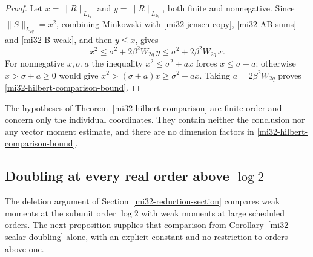 \documentclass[11pt]{article}
\theoremstyle{definition}
\theoremstyle{remark}
\newcommand{\norm}[1]{\lVert#1\rVert}
\begin{document}
\begin{proof}
Let $x=\norm{R}_{L_{4q}}$ and $y=\norm{R}_{L_{2q}}$, both finite and
nonnegative. Since $\norm{S}_{L_{2q}}=x^2$, combining Minkowski with
\eqref{mi32-jensen-copy}, \eqref{mi32-AB-sums} and
\eqref{mi32-B-weak}, and then $y\le x$, gives
\[
 x^2\le\sigma^2+2\beta^2W_{2q}\,y\le\sigma^2+2\beta^2W_{2q}\,x .
\]
For nonnegative $x,\sigma,a$ the inequality $x^2\le\sigma^2+ax$ forces
$x\le\sigma+a$: otherwise $x>\sigma+a\ge0$ would give
$x^2>(\sigma+a)x\ge\sigma^2+ax$. Taking $a=2\beta^2W_{2q}$ proves
\eqref{mi32-hilbert-comparison-bound}.
\end{proof}

The hypotheses of Theorem~\ref{mi32-hilbert-comparison} are finite-order
and concern only the individual coordinates. They contain neither the
conclusion nor any vector moment estimate, and there are no dimension
factors in \eqref{mi32-hilbert-comparison-bound}.

\subsection{Doubling at every real order above \texorpdfstring{$\log2$}{log 2}}

The deletion argument of Section~\ref{mi32-reduction-section} compares
weak moments at the subunit order $\log2$ with weak moments at large
scheduled orders. The next proposition supplies that comparison from
Corollary~\ref{mi32-scalar-doubling} alone, with an explicit constant
and no restriction to orders above one.
\end{document}
